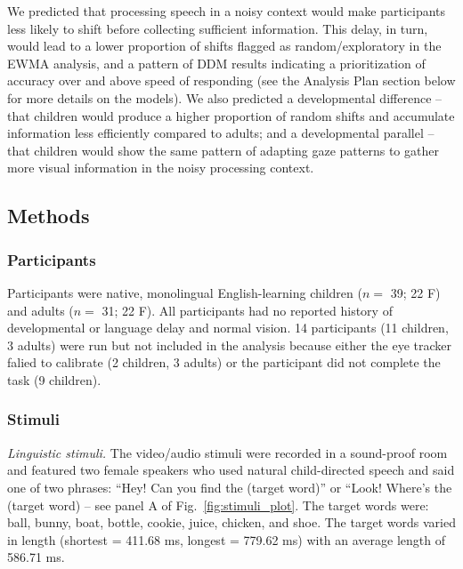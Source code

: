 \documentclass[english,man]{apa6}
\theoremstyle{definition}
\theoremstyle{definition}
\theoremstyle{definition}
\theoremstyle{remark}
\begin{document}
We predicted that processing speech in a noisy context would make
participants less likely to shift before collecting sufficient
information. This delay, in turn, would lead to a lower proportion of
shifts flagged as random/exploratory in the EWMA analysis, and a pattern
of DDM results indicating a prioritization of accuracy over and above
speed of responding (see the Analysis Plan section below for more
details on the models). We also predicted a developmental difference --
that children would produce a higher proportion of random shifts and
accumulate information less efficiently compared to adults; and a
developmental parallel -- that children would show the same pattern of
adapting gaze patterns to gather more visual information in the noisy
processing context.

\hypertarget{methods-2}{%
\subsection{Methods}\label{methods-2}}

\hypertarget{participants-2}{%
\subsubsection{Participants}\label{participants-2}}

Participants were native, monolingual English-learning children (\(n=\)
39; 22 F) and adults (\(n=\) 31; 22 F). All participants had no reported
history of developmental or language delay and normal vision. 14
participants (11 children, 3 adults) were run but not included in the
analysis because either the eye tracker falied to calibrate (2 children,
3 adults) or the participant did not complete the task (9 children).

\hypertarget{stimuli-2}{%
\subsubsection{Stimuli}\label{stimuli-2}}

\emph{Linguistic stimuli.} The video/audio stimuli were recorded in a
sound-proof room and featured two female speakers who used natural
child-directed speech and said one of two phrases: \enquote{Hey! Can you
find the (target word)} or ``Look! Where's the (target word) -- see
panel A of Fig.~\ref{fig:stimuli_plot}. The target words were: ball,
bunny, boat, bottle, cookie, juice, chicken, and shoe. The target words
varied in length (shortest = 411.68 ms, longest = 779.62 ms) with an
average length of 586.71 ms.
\end{document}
